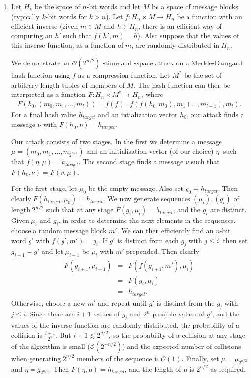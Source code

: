 \begin{enumerate}
\item Let $H_n$ be the space of $n$-bit words and let $M$ be a space of message
blocks (typically $k$-bit words for $k>n$). Let $f: H_n \times M \rightarrow H_n$
be a function with an efficient inverse (given $m \in M$ and
$h \in H_n$, there is an efficient way of computing an $h'$ such that $f(h',m)=h$).
Also suppose that the values of this inverse function, as a function of $m$,
are randomly distributed in $H_n$.

We demonstrate an $\mathcal{O}(2^{n/2})$ -time and -space attack on a
Merkle-Damgard hash function using $f$ as a compression function. Let $M^*$ be
the set of arbitrary-length tuples of members of $M$. The hash function can
then be interpreted as a function $F: H_n \times M^* \rightarrow H_n$, where
\begin{eqnarray*}
F(h_0,(m_0,m_1,\dots,m_l))=f(f(\dots f(f(h_0,m_0),m_1)\dots,m_{l-1}),m_l).
\end{eqnarray*}
For a final hash value $h_{target}$ and an intialization vector $h_0$, our attack
finds a message $\nu$ with $F(h_0,\nu)=h_{target}$.

Our attack consists of two stages. In the first we determine a message
$\mu = (m_0,m_1,\dots,m_{2^{n/2}})$ and an initialisation vector (of our choice)
$\eta$, such that $f(\eta,\mu)=h_{target}$. The second stage finds a message $\nu$
such that $F(h_0,\nu)=F(\eta,\mu)$.

For the first stage, let $\mu_0$ be the empty message. Also set $g_0=h_{target}$. Then clearly 
$F(h_{target},\mu_0)=h_{target}$. We now generate sequences $(\mu_i),(g_i)$ of length $2^{n/2}$ 
such that at any stage $F(g_i,\mu_i)=h_{target}$, and the $g_i$ are distinct.
Given $\mu_i$ and $g_i$, in order to determine the next elements in the sequences,
choose a random message block $m'$. We can then efficiently find an $n$-bit word $g'$ with
$f(g',m')=g_i$. If $g'$ is distinct from each $g_j$ with $j\le i$, then set $g_{i+1}=g'$
and let $\mu_{i+1}$ be $\mu_i$ with $m'$ prepended. Then clearly 
\begin{eqnarray*}
	F(g_{i+1},\mu_{i+1})&=&F(f(g_{i+1},m'),\mu_i)\\
																		 &=&F(g_i,\mu_i)\\
																		 &=&h_{target}.
\end{eqnarray*}
Otherwise, choose a new $m'$
and repeat until $g'$ is distinct from the $g_j$ with $j\le i$. Since there are $i+1$ values
of $g_j$ and $2^n$ possible values of $g'$,  and the values of
the inverse function are randomly distributed, the probability of a collision is $\frac{i+1}{2^n}$.
But $i+1\lesssim 2^{n/2}$, so the probability of a collision at any stage
of the algorithm is small ($\mathcal{O}(2^{-n/2})$) and the expected number of collisions
when generating $2^{n/2}$ members of the sequence is $\mathcal{O}(1)$. Finally, set $\mu = \mu_{2^{n/2}}$
and $\eta=g_{2^{n/2}}$. Then $F(\eta,\mu)=h_{target}$, and the length of $\mu$ is $2^{n/2}$ as required.


\end{enumerate}
